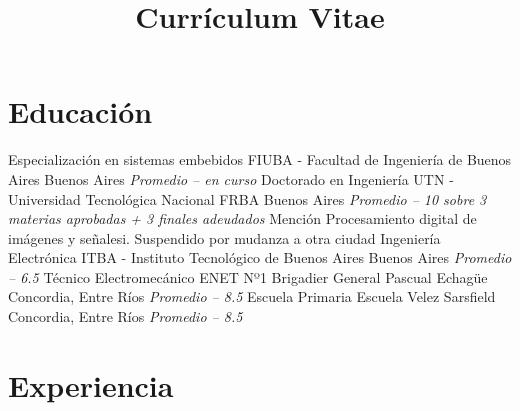 \documentclass[11pt,a4paper,sans]{moderncv}  %
\title               { Currículum Vitae                                                    }
\begin{document}
\makecvtitle %
\section{Educación}
 { Especialización en sistemas embebidos} { FIUBA - Facultad de Ingeniería de Buenos Aires} { Buenos Aires}          { \textit { Promedio -- en curso}}                                            { }
 { Doctorado en Ingeniería}               { UTN - Universidad Tecnológica Nacional FRBA}    { Buenos Aires}          { \textit { Promedio -- 10 sobre 3 materias aprobadas + 3 finales adeudados}} { Mención Procesamiento digital de imágenes y señalesi. Suspendido por mudanza a otra ciudad}
 { Ingeniería Electrónica}                { ITBA - Instituto Tecnológico de Buenos Aires}   { Buenos Aires}          { \textit { Promedio -- 6.5}}                                                 { }
 { Técnico Electromecánico}               { ENET Nº1 Brigadier General Pascual Echagüe}     { Concordia, Entre Ríos} { \textit { Promedio -- 8.5}}                                                 { }
 { Escuela Primaria}                      { Escuela Velez Sarsfield}                        { Concordia, Entre Ríos} { \textit { Promedio -- 8.5}}                                                 { }
\section{Experiencia}
\end{document}
